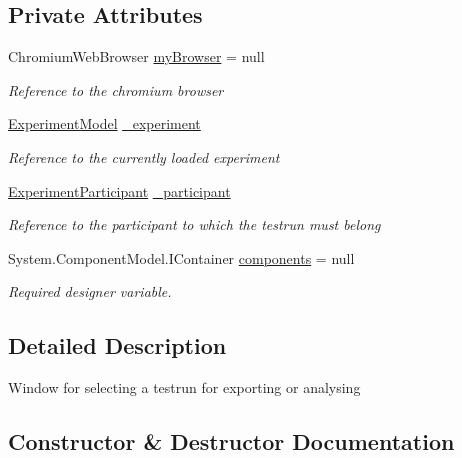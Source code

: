 \subsection*{Private Attributes}
\begin{DoxyCompactItemize}
\item 
Chromium\+Web\+Browser \hyperlink{class_web_analyzer_1_1_u_i_1_1_select_testrun_form_ac2ba9aef1d2ceece915af46662af8165}{my\+Browser} = null
\begin{DoxyCompactList}\small\item\em Reference to the chromium browser \end{DoxyCompactList}\item 
\hyperlink{class_web_analyzer_1_1_models_1_1_base_1_1_experiment_model}{Experiment\+Model} \hyperlink{class_web_analyzer_1_1_u_i_1_1_select_testrun_form_a26ee759649ddb490af64ca4cc1ed8f7d}{\+\_\+experiment}
\begin{DoxyCompactList}\small\item\em Reference to the currently loaded experiment \end{DoxyCompactList}\item 
\hyperlink{class_web_analyzer_1_1_models_1_1_base_1_1_experiment_participant}{Experiment\+Participant} \hyperlink{class_web_analyzer_1_1_u_i_1_1_select_testrun_form_a9fbdf75acb0a8d04157129fbd27bbf84}{\+\_\+participant}
\begin{DoxyCompactList}\small\item\em Reference to the participant to which the testrun must belong \end{DoxyCompactList}\item 
System.\+Component\+Model.\+I\+Container \hyperlink{class_web_analyzer_1_1_u_i_1_1_select_testrun_form_a43bab9a7a55629d8d75ffd3b719bfe67}{components} = null
\begin{DoxyCompactList}\small\item\em Required designer variable. \end{DoxyCompactList}\end{DoxyCompactItemize}


\subsection{Detailed Description}
Window for selecting a testrun for exporting or analysing 



\subsection{Constructor \& Destructor Documentation}
\hypertarget{class_web_analyzer_1_1_u_i_1_1_select_testrun_form_ad8de83de444fe5832e7bb01fbd488825}{}
